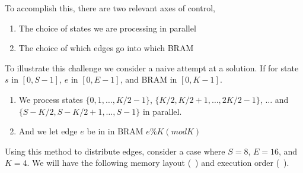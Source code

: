 To accomplish this, there are two relevant axes of control,

\begin{enumerate}
    \item The choice of states we are processing in parallel
    \item The choice of which edges go into which BRAM
\end{enumerate}



To illustrate this challenge we consider a naive attempt at a solution. If for state $s$ in $[0, S-1]$, $e$ in $[0, E-1]$, and BRAM in $[0, K-1]$.

\begin{enumerate}
    \item We process states $\{0, 1, \ldots, K/2-1\}$, $\{K/2, K/2+1, \ldots, 2K/2-1\}$, $\ldots$ and $\{S-K/2, S-K/2+1 , \ldots, S-1\}$ in parallel.
    \item And we let edge $e$ be in in BRAM $e\%K (mod K)$
\end{enumerate}

Using this method to distribute edges, consider a case where $S = 8$, $E = 16$, and $K = 4$. We will have the following memory layout (\Figure~) and execution order (\Figure~).


